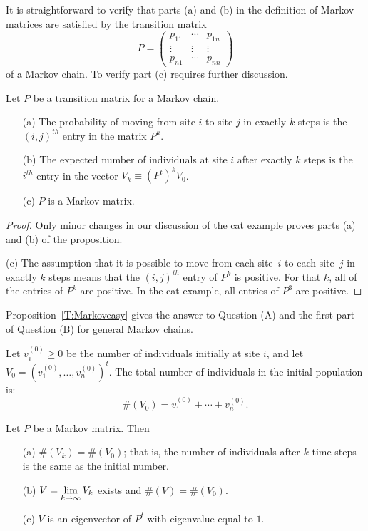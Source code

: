 \documentclass{ximera}
\begin{document}
It is straightforward to verify that parts (a) and (b) in the definition of
Markov matrices are satisfied by the transition matrix
\[
P = \left(\begin{array}{ccc} p_{11} & \cdots & p_{1n} \\
	\vdots & \vdots & \vdots \\ p_{n1} & \cdots & p_{nn}
\end{array}\right)
\]
of a Markov chain.  To verify part (c) requires further discussion.

\begin{prop}   \label{T:Markoveasy}
Let $P$ be a transition matrix for a
Markov chain.
\begin{enumerate}
\item[(a)]  The probability of moving from site $i$ to site $j$ in exactly
$k$ steps is the $(i,j)^{th}$ entry in the matrix $P^k$.
\item[(b)]  The expected number of individuals at site $i$ after exactly $k$
steps is the $i^{th}$ entry in the vector $V_k\equiv (P^t)^kV_0$.
\item[(c)]  $P$ is a Markov matrix.
\end{enumerate}
\end{prop}

\begin{proof} Only minor changes in our discussion of the cat example proves parts
(a) and (b) of the proposition.

(c) The assumption that it is possible to move from each site~$i$ to each
site~$j$ in exactly $k$ steps means that the $(i,j)^{th}$ entry of $P^k$ is
positive.  For that $k$, all of the entries of $P^k$ are positive.  In the
cat example, all entries of $P^3$ are positive.  \end{proof}

Proposition~\ref{T:Markoveasy} gives the answer to Question (A) and the first
part of Question (B) for general Markov chains.

Let $v_i^{(0)}\ge 0$ be the number of individuals initially at site $i$, and
let $V_0=(v_1^{(0)},\ldots,v_n^{(0)})^t$.  The total number of individuals
in the initial population is:
\[
\#(V_0) = v_1^{(0)} + \cdots + v_n^{(0)}.
\]

\begin{thm}  \label{T:Markov}
Let $P$ be a Markov matrix.  Then
\begin{enumerate}
\item[(a)]  $\#(V_k)=\#(V_0)$; that is, the number of individuals after $k$
time steps is the same as the initial number.
\item[(b)]  $\displaystyle V = \lim_{k\to\infty}V_k$ exists and $\#(V)=\#(V_0)$.
\item[(c)]  $V$ is an eigenvector of $P^t$ with eigenvalue equal to $1$.
\end{enumerate}
\end{thm}
\end{document}
